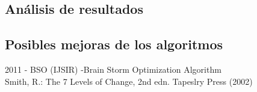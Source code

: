 \subsection{Análisis de resultados}



\subsection{Posibles mejoras de los algoritmos}


\newpage
\begin{thebibliography}{9}
	 2011 - BSO (IJSIR) -Brain Storm Optimization Algorithm\\
	
	 Smith, R.: The 7 Levels of Change, 2nd edn. Tapeslry Press (2002)\\
	
\end{thebibliography}








